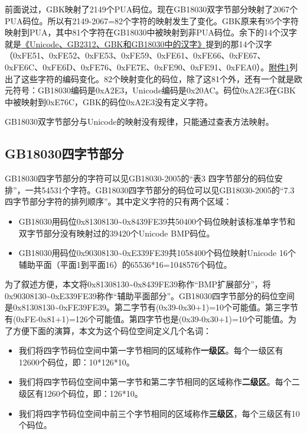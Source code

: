\documentclass[cn,hazy,blue,14pt,screen]{elegantnote}
\begin{document}
前面说过，GBK映射了2149个PUA码位。现在GB18030双字节部分映射了2067个PUA码位。所以有2149-2067=82个字符的映射发生了变化。GBK原来有95个字符映射到PUA，其中81个字符在GB18030中被映射到非PUA码位。余下的14个汉字就是\href{text24.html}{《Unicode、GB2312、GBK和GB18030中的汉字》}提到的那14个汉字（0xFE51、0xFE52、0xFE53、0xFE59、0xFE61、0xFE66、0xFE67、0xFE6C、0xFE6D、0xFE76、0xFE7E、0xFE90、0xFE91、0xFEA0）。\href{samples/gbk.zip}{附件1}列出了这些字符的编码变化。82个映射变化的码位，除了这81个外，还有一个就是欧元符号：GB18030编码是0xA2E3，Unicode编码是0x20AC。码位0xA2E3在GBK中被映射到0xE76C，GBK的码位0xA2E3没有定义字符。

GB18030双字节部分与Unicode的映射没有规律，只能通过查表方法映射。

\hypertarget{gb18030ux56dbux5b57ux8282ux90e8ux5206}{%
\subsection{GB18030四字节部分}\label{gb18030ux56dbux5b57ux8282ux90e8ux5206}}

GB18030四字节部分的字符可以见GB18030-2005的``表3
四字节部分的码位安排''，一共54531个字符。GB18030四字节部分的码位可以见GB18030-2005的``7.3
四字节部分字符的排列顺序''。其中定义字符的只有两个区域：

\begin{itemize}

\item
  GB18030用码位0x81308130\textasciitilde0x8439FE39共50400个码位映射该标准单字节和双字节部分没有映射过的39420个Unicode
  BMP码位。
\item
  GB18030用码位0x90308130\textasciitilde0xE339FE39共1058400个码位映射Unicode
  16个辅助平面（平面1到平面16）的65536*16=1048576个码位。
\end{itemize}

为了叙述方便，本文将0x81308130\textasciitilde0x8439FE39称作``BMP扩展部分''，将0x90308130\textasciitilde0xE339FE39称作``辅助平面部分''。GB18030四字节部分的码位空间是0x81308130\textasciitilde0xFE39FE39。第二字节有(0x39-0x30+1)=10个可能值。第三字节有(0xFE-0x81+1)=126个可能值。第四字节也是(0x39-0x30+1)=10个可能值。为了方便下面的演算，本文为这个码位空间定义几个名词：

\begin{itemize}

\item
  我们将四字节码位空间中第一字节相同的区域称作\textbf{一级区}。每个一级区有12600个码位，即：10*126*10。
\item
  我们将四字节码位空间中第一字节和第二字节相同的区域称作\textbf{二级区}。每个二级区有1260个码位，即：126*10。
\item
  我们将四字节码位空间中前三个字节相同的区域称作\textbf{三级区}，每个三级区有10个码位。
\end{itemize}
\end{document}
